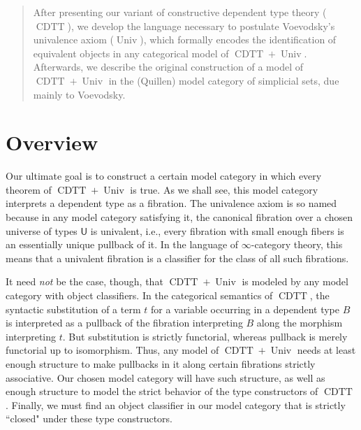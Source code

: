 \documentclass[10pt,letterpaper,cm]{nupset}
\theoremstyle{definition}
\theoremstyle{theorem}
\theoremstyle{remark}
\newcommand{\U}{\mathsf{U}}
\newcommand{\0}{\mathbf{0}}
\newcommand{\1}{\mathbf{1}}
\newcommand{\2}{\mathbf{2}}
\DeclareMathOperator{\cdtt}{\mathrm{CDTT}}
\DeclareMathOperator{\univ}{\mathrm{Univ}}
\begin{document}
\begin{abstract}
 After presenting our variant of constructive dependent type theory ($\cdtt$), we develop the language necessary to postulate Voevodsky's univalence axiom ($\univ$), which formally encodes the identification of equivalent objects in any categorical model of $\cdtt + \univ$. Afterwards, we describe the original construction of a model of $\cdtt+\univ$ in the (Quillen)  model category of simplicial sets, due mainly to Voevodsky.
\end{abstract}

\tableofcontents
{}
\pagebreak

\section*{Overview}
\setcounter{page}{1}

Our ultimate goal is to construct a certain  model category  in which every theorem of $\cdtt +\univ$ is true.
As we shall see, this model category interprets a dependent type as a fibration. The univalence axiom is so named because in any model category satisfying it, the canonical fibration over a chosen universe of types $\U$ is univalent, i.e.,  every fibration with small enough fibers is an essentially unique pullback of it. In the language of $\infty$-category theory, this means that a univalent fibration is a classifier for the class of all such fibrations.

\medskip

It need \emph{not} be the case, though, that $\cdtt+\univ$ is modeled by any model category with object classifiers. In the categorical semantics of $\cdtt$, the syntactic substitution of a term $t$ for a variable occurring in a dependent type $B$ is interpreted as a pullback of the fibration interpreting $B$ along the morphism interpreting $t$. But substitution is strictly functorial, whereas pullback is merely functorial up to isomorphism. Thus, any model of $\cdtt+\univ$ needs at least enough structure to make pullbacks in it along certain fibrations strictly associative. Our chosen  model category will have such structure, as well as enough structure to model the strict behavior of the type constructors of $\cdtt$. Finally, we must find an object classifier in our model category that is strictly ``closed" under these type constructors. 
\end{document}
